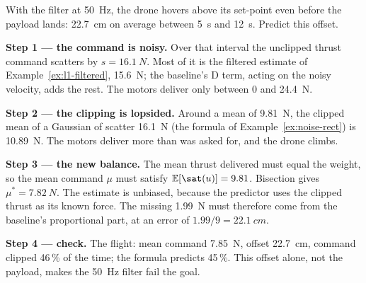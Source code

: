 
\begin{example}
\label{ex:l1-rect}
With the filter at \SI{50}{Hz}, the drone hovers above its set-point even before the payload lands: \SI{22.7}{cm} on average between \SI{5}{s} and \SI{12}{s}. Predict this offset.

\textbf{Step 1 — the command is noisy.} Over that interval the unclipped thrust command scatters by $s = \SI{16.1}{N}$. Most of it is the filtered estimate of Example~\ref{ex:l1-filtered}, \SI{15.6}{N}; the baseline's D term, acting on the noisy velocity, adds the rest. The motors deliver only between 0 and \SI{24.4}{N}.

\textbf{Step 2 — the clipping is lopsided.} Around a mean of \SI{9.81}{N}, the clipped mean of a Gaussian of scatter \SI{16.1}{N} (the formula of Example~\ref{ex:noise-rect}) is \SI{10.89}{N}. The motors deliver more than was asked for, and the drone climbs.

\textbf{Step 3 — the new balance.} The mean thrust delivered must equal the weight, so the mean command $\mu$ must satisfy $\mathbb E[\sat(u)] = 9.81$. Bisection gives $\mu^* = \SI{7.82}{N}$. The estimate is unbiased, because the predictor uses the clipped thrust as its known force. The missing \SI{1.99}{N} must therefore come from the baseline's proportional part, at an error of $1.99/9 = \SI{22.1}{cm}$.

\textbf{Step 4 — check.} The flight: mean command \SI{7.85}{N}, offset \SI{22.7}{cm}, command clipped 46\,\% of the time; the formula predicts 45\,\%. This offset alone, not the payload, makes the \SI{50}{Hz} filter fail the goal.
\end{example}

